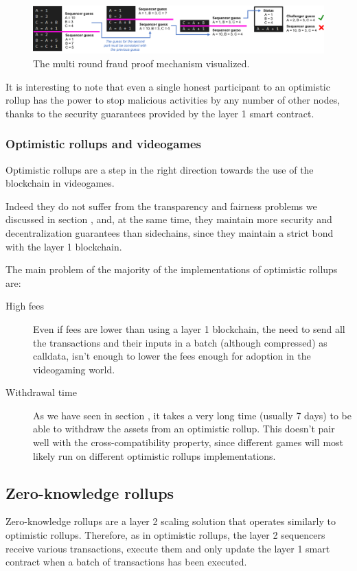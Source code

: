 \documentclass[12pt]{article}
\begin{document}
\begin{figure}[ht]
    \centering
    \includegraphics[width=\textwidth]{multi_round_fraud_proof}
    \caption{The multi round fraud proof mechanism visualized.}
    \label{figure:multi_round_fraud_proof}
\end{figure}

It is interesting to note that even a single honest participant to an optimistic rollup has the power to stop malicious activities by any number of other nodes, thanks to the security guarantees provided by the layer 1 smart contract.

\subsubsection{Optimistic rollups and videogames} \label{subsubsection:orav}
Optimistic rollups are a step in the right direction towards the use of the blockchain in videogames.

Indeed they do not suffer from the transparency and fairness problems we discussed in section , and, at the same time, they maintain more security and decentralization guarantees than sidechains, since they maintain a strict bond with the layer 1 blockchain.

The main problem of the majority of the implementations of optimistic rollups are:
\begin{description}
    \item[High fees] Even if fees are lower than using a layer 1 blockchain, the need to send all the transactions and their inputs in a batch (although compressed) as calldata, isn't enough to lower the fees enough for adoption in the videogaming world.
    \item[Withdrawal time] As we have seen in section , it takes a very long time (usually 7 days) to be able to withdraw the assets from an optimistic rollup. This doesn't pair well with the cross-compatibility property, since different games will most likely run on different optimistic rollups implementations.
\end{description}

\subsection{Zero-knowledge rollups} \label{subsection:zk_rollups}
Zero-knowledge rollups are a layer 2 scaling solution that operates similarly to optimistic rollups. Therefore, as in optimistic rollups, the layer 2 sequencers receive various transactions, execute them and only update the layer 1 smart contract when a batch of transactions has been executed.
\end{document}
